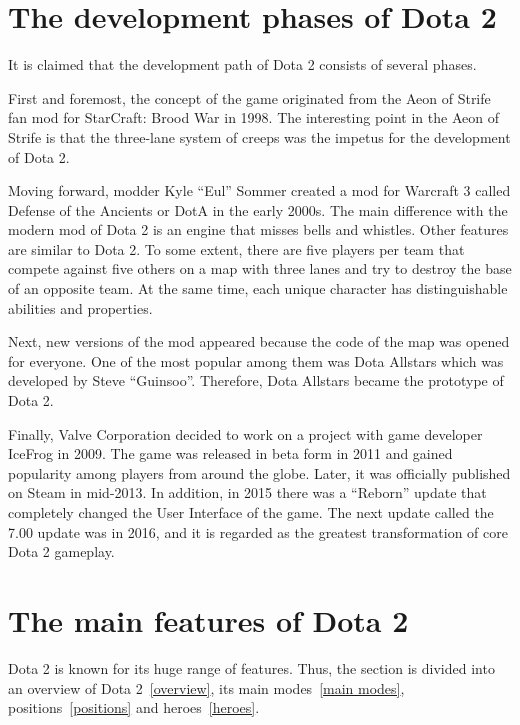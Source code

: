\documentclass[10pt,twoside,slovak,a4paper]{article}
\begin{document}
\section{The development phases of Dota 2} \label{The development phases of Dota 2}
It is claimed that the development path of Dota 2 consists of several phases.

First and foremost, the concept of the game originated from the Aeon of Strife fan mod for StarCraft: Brood War in 1998\cite{Stubbs:Rise}. The interesting point in the Aeon of Strife is that the three-lane system of creeps was the impetus for the development of Dota 2. 

Moving forward, modder Kyle “Eul” Sommer created a mod for Warcraft 3 called Defense of the Ancients or DotA in the early 2000s. The main difference with the modern mod of Dota 2 is an engine that misses bells and whistles. Other features are similar to Dota 2. To some extent, there are five players per team that compete against five others on a map with three lanes and try to destroy the base of an opposite team. At the same time, each unique character has distinguishable abilities and properties. 

Next, new versions of the mod appeared because the code of the map was opened for everyone. One of the most popular among them was Dota Allstars\cite{Pra:What} which was developed by Steve “Guinsoo”. Therefore, Dota Allstars became the prototype of Dota 2.

Finally, Valve Corporation decided to work on a project with game developer IceFrog in 2009. The game was released in beta form in 2011 and gained popularity among players from around the globe. Later, it was officially published on Steam in mid-2013. In addition, in 2015 there was a “Reborn” update that completely changed the User Interface of the game. The next update called the 7.00 update was in 2016, and it is regarded as the greatest transformation of core Dota 2 gameplay.




\section{The main features of Dota 2} \label{The main features of Dota 2}


Dota 2 is known for its huge range of features. Thus, the section is divided into an overview of Dota 2~\ref{overview}, its main modes~\ref{main modes}, positions~\ref{positions} and heroes~\ref{heroes}. 
\end{document}
